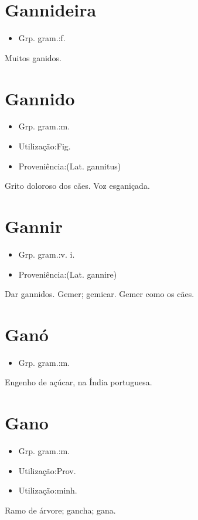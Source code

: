 \section{Gannideira}
\begin{itemize}
\item {Grp. gram.:f.}
\end{itemize}
Muitos ganidos.
\section{Gannido}
\begin{itemize}
\item {Grp. gram.:m.}
\end{itemize}
\begin{itemize}
\item {Utilização:Fig.}
\end{itemize}
\begin{itemize}
\item {Proveniência:(Lat. \textunderscore gannitus\textunderscore )}
\end{itemize}
Grito doloroso dos cães.
Voz esganiçada.
\section{Gannir}
\begin{itemize}
\item {Grp. gram.:v. i.}
\end{itemize}
\begin{itemize}
\item {Proveniência:(Lat. \textunderscore gannire\textunderscore )}
\end{itemize}
Dar gannidos.
Gemer; gemicar.
Gemer como os cães.
\section{Ganó}
\begin{itemize}
\item {Grp. gram.:m.}
\end{itemize}
Engenho de açúcar, na Índia portuguesa.
\section{Gano}
\begin{itemize}
\item {Grp. gram.:m.}
\end{itemize}
\begin{itemize}
\item {Utilização:Prov.}
\end{itemize}
\begin{itemize}
\item {Utilização:minh.}
\end{itemize}
Ramo de árvore; gancha; gana.
